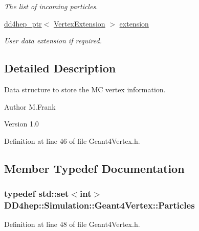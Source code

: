 \begin{DoxyCompactItemize}
\begin{DoxyCompactList}\small\item\em The list of incoming particles. \item\end{DoxyCompactList}\item 
\hyperlink{class_d_d4hep_1_1dd4hep__ptr}{dd4hep\_\-ptr}$<$ \hyperlink{class_d_d4hep_1_1_simulation_1_1_vertex_extension}{VertexExtension} $>$ \hyperlink{class_d_d4hep_1_1_simulation_1_1_geant4_vertex_ae8dbe294b3aa5ef164d5a8e5b4c7895c}{extension}
\begin{DoxyCompactList}\small\item\em User data extension if required. \item\end{DoxyCompactList}\end{DoxyCompactItemize}


\subsection{Detailed Description}
Data structure to store the MC vertex information. \begin{DoxyAuthor}{Author}
M.Frank 
\end{DoxyAuthor}
\begin{DoxyVersion}{Version}
1.0 
\end{DoxyVersion}


Definition at line 46 of file Geant4Vertex.h.

\subsection{Member Typedef Documentation}
\hypertarget{class_d_d4hep_1_1_simulation_1_1_geant4_vertex_a7a0331b96dfa8ff9b4a802caa8dd031c}{
\subsubsection[{Particles}]{\setlength{\rightskip}{0pt plus 5cm}typedef std::set$<$int$>$ {\bf DD4hep::Simulation::Geant4Vertex::Particles}}}
\label{class_d_d4hep_1_1_simulation_1_1_geant4_vertex_a7a0331b96dfa8ff9b4a802caa8dd031c}


Definition at line 48 of file Geant4Vertex.h.


